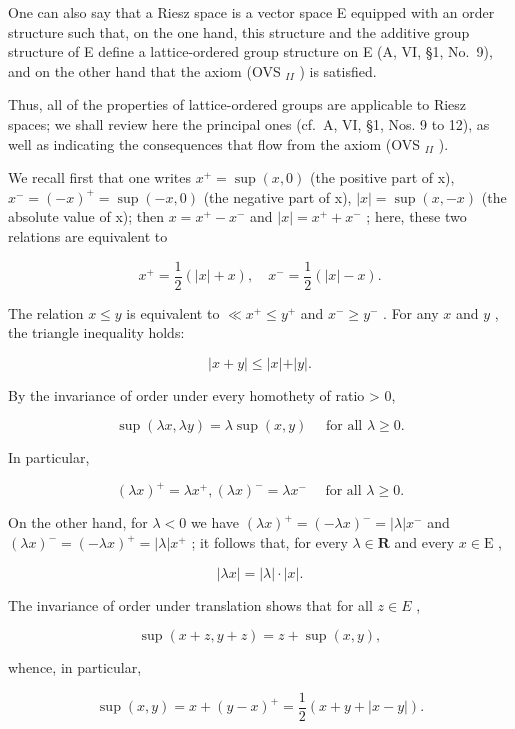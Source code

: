 One can also say that a Riesz space is a vector space E equipped with an order structure such that, on the one hand, this structure and the additive group structure of E define a lattice-ordered group structure on E (A, VI, §1, No.~9), and on the other hand that the axiom (OVS \(_{II}\) ) is satisfied.

Thus, all of the properties of lattice-ordered groups are applicable to Riesz spaces; we shall review here the principal ones (cf.~A, VI, §1, Nos. 9 to 12), as well as indicating the consequences that flow from the axiom (OVS \(_{II}\) ).

We recall first that one writes \(x^{+} = \sup(x,0)\) (the positive part of x), \(x^{-} = (-x)^{+} = \sup(-x,0)\) (the negative part of x), \(|x| = \sup(x,-x)\) (the absolute value of x); then \(x = x^{+} - x^{-}\) and \(|x| = x^{+} + x^{-}\) ; here, these two relations are equivalent to

\[
x ^ {+} = \frac {1}{2} (| x | + x), \quad x ^ {-} = \frac {1}{2} (| x | - x).
\]

The relation \(x \leqslant y\) is equivalent to \(\ll x^{+} \leqslant y^{+}\) and \(x^{-} \geqslant y^{-}\) . For any \(x\) and \(y\) , the triangle inequality holds:

\[
\vert x + y \vert \leqslant \vert x \vert + \vert y \vert .\tag{1}
\]

By the invariance of order under every homothety of ratio \textgreater{} 0,

\[
\sup (\lambda x, \lambda y) = \lambda \sup (x, y) \quad \text { for   all } \lambda \geqslant 0.\tag{2}
\]

In particular,

\[
(\lambda x) ^ {+} = \lambda x ^ {+}, (\lambda x) ^ {-} = \lambda x ^ {-} \quad \text { for   all } \lambda \geqslant 0.\tag{3}
\]

On the other hand, for \(\lambda < 0\) we have \((\lambda x)^{+} = (-\lambda x)^{-} = |\lambda |x^{-}\) and \((\lambda x)^{-} = (-\lambda x)^{+} = |\lambda |x^{+}\) ; it follows that, for every \(\lambda \in \mathbf{R}\) and every \(x\in \mathrm{E}\) ,

\[
\left| \lambda x \right| = \left| \lambda \right| \cdot \left| x \right|.\tag{4}
\]

The invariance of order under translation shows that for all \(z \in E\) ,

\[
\sup (x + z, y + z) = z + \sup (x, y),\tag{5}
\]

whence, in particular,

\[
\sup (x, y) = x + (y - x) ^ {+} = \frac {1}{2} (x + y + | x - y |).\tag{6}
\]

